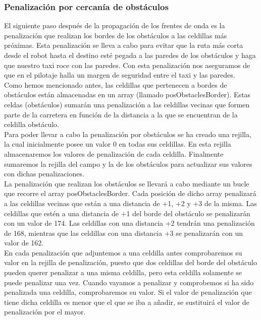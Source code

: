 \subsubsection{Penalización por cercanía de obstáculos}
El siguiente paso después de la propagación de los frentes de onda es la penalización que realizan los bordes de los obstáculos a las celdillas más próximas. Esta penalización se lleva a cabo para evitar que la ruta más corta desde el robot hasta el destino esté pegada a las paredes de los obstáculos y haga que nuestro taxi roce con las paredes. Con esta penalización nos aseguramos de que en el pilotaje halla un margen de seguridad entre el taxi y las paredes.\\

Como hemos mencionado antes, las celdillas que pertenecen a bordes de obstáculos están almacenadas en un array (llamado posObstaclesBorder). Estas celdas (obstáculos) sumarán una penalización a las celdillas vecinas que formen parte de la carretera en función de la distancia a la que se encuentran de la celdilla obstáculo.\\

Para poder llevar a cabo la penalización por obstáculos se ha creado una rejilla, la cual inicialmente posee un valor 0 en todas sus celdillas. En esta rejilla almacenaremos los valores de penalización de cada celdilla. Finalmente sumaremos la rejilla del campo y la de los obstáculos para actualizar sus valores con dichas penalizaciones.\\

La penalización que realizan los obstáculos se llevará a cabo mediante un bucle que recorre el array posObstaclesBorder. Cada posición de dicho array penalizará a las celdillas vecinas que están a una distancia de +1, +2 y +3 de la misma. Las celdillas que estén a una distancia de +1 del borde del obstáculo se penalizarán con un valor de 174. Las celdillas con una distancia +2 tendrán una penalización de 168, mientras que las celdillas con una distancia +3 se penalizarán con un valor de 162.\\

En cada penalización que adjuntemos a una celdilla antes comprobaremos su valor en la rejilla de penalización, puesto que dos celdillas del borde del obstáculo pueden querer penalizar a una misma celdilla, pero esta celdilla solamente se puede penalizar una vez. Cuando vayamos a penalizar y comprobemos si ha sido penalizada una celdilla, comprobaremos su valor. Si el valor de penalización que tiene dicha celdilla es menor que el que se iba a añadir, se sustituirá el valor de penalización por el mayor.\\

